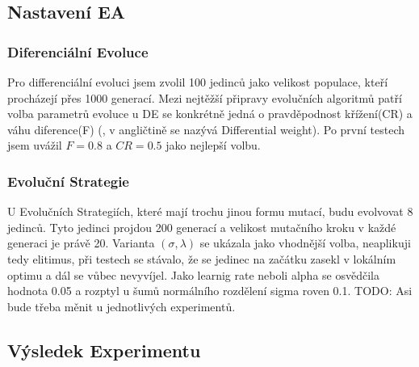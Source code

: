 \subsection{Nastavení EA}
\subsubsection{Diferenciální Evoluce}
Pro differenciální evoluci jsem zvolil 100 jedinců jako velikost populace, kteří procházejí přes 1000 generací. Mezi nejtěžší připravy evolučních algoritmů patří volba parametrů evoluce u DE se konkrétně jedná o pravděpodnost křížení(CR) a váhu diference(F) (, v angličtině se nazývá Differential weight). Po první testech jsem uvážil $F = 0.8 $ a $CR = 0.5$ jako nejlepší volbu. 
\subsubsection{Evoluční Strategie}
U Evolučních Strategiích, které mají trochu jinou formu mutací, budu evolvovat 8 jedinců. Tyto jedinci projdou 200 generací a velikost mutačního kroku  v každé generaci je právě 20. Varianta $(\sigma,\lambda)$ se ukázala jako vhodnější volba, neaplikuji tedy elitimus, při testech se stávalo, že se jedinec na začátku zasekl v lokálním optimu a dál se vůbec nevyvíjel. Jako learnig rate neboli alpha se osvědčila hodnota 0.05 a rozptyl u šumů normálního rozdělení sigma roven 0.1. TODO: Asi bude třeba měnit u jednotlivých experimentů.
\subsection{Výsledek Experimentu}
